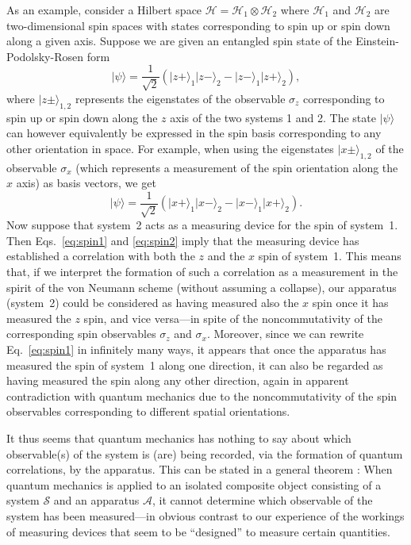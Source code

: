 \documentclass[twocolumn,rmp,aps,amsmath,amsfonts,noshowkeys,noshowpacs]{revtex4}
\newcommand{\ket}[1]{\ensuremath{|{#1\rangle}}}
\begin{document}
As an example, consider a Hilbert space
$\mathcal{H}=\mathcal{H}_1\otimes \mathcal{H}_2$ where $\mathcal{H}_1$
and $\mathcal{H}_2$ are two-dimensional spin spaces with states
corresponding to spin up or spin down along a given axis. Suppose we
are given an entangled spin state of the Einstein-Podolsky-Rosen form
\cite{Einstein:1935:dr}
%
\begin{equation} \label{eq:spin1} 
\ket{\psi} = \frac{1}{\sqrt{2}} (\ket{z+}_1
\ket{z-}_2 - \ket{z-}_1 \ket{z+}_2), 
\end{equation}
%
where $\ket{z\pm}_{1,2}$ represents the eigenstates of the observable
$\sigma_z$ corresponding to spin up or spin down along the $z$ axis of
the two systems 1 and 2. The state $\ket{\psi}$ can however
equivalently be expressed in the spin basis corresponding to any other
orientation in space. For example, when using the eigenstates
$\ket{x\pm}_{1,2}$ of the observable $\sigma_x$ (which represents a
measurement of the spin orientation along the $x$ axis) as basis
vectors, we get
%
\begin{equation} \label{eq:spin2} 
\ket{\psi} = \frac{1}{\sqrt{2}} (\ket{x+}_1
\ket{x-}_2 - \ket{x-}_1 \ket{x+}_2). 
\end{equation}
%
Now suppose that system~2 acts as a measuring device for the spin of
system~1.  Then Eqs.~\eqref{eq:spin1} and \eqref{eq:spin2} imply that
the measuring device has established a correlation with both the $z$
and the $x$ spin of system~1. This means that, if we interpret the
formation of such a correlation as a measurement in the spirit of the
von Neumann scheme (without assuming a collapse), our apparatus
(system~2) could be considered as having measured also the $x$ spin
once it has measured the $z$ spin, and vice versa---in spite of the
noncommutativity of the corresponding spin observables $\sigma_z$ and
$\sigma_x$. Moreover, since we can rewrite Eq.~\eqref{eq:spin1} in
infinitely many ways, it appears that once the apparatus has measured
the spin of system~1 along one direction, it can also be regarded as
having measured the spin along any other direction, again in apparent
contradiction with quantum mechanics due to the noncommutativity of
the spin observables corresponding to different spatial orientations.

It thus seems that quantum mechanics has nothing to say about which
observable(s) of the system is (are) being recorded, via the formation
of quantum correlations, by the apparatus. This can be stated in a
general theorem \citep{Zurek:1981:dd,Auletta:2000:rv}: When quantum
mechanics is applied to an isolated composite object consisting
of a system $\mathcal{S}$ and an apparatus $\mathcal{A}$, it cannot
determine which observable of the system has been measured---in
obvious contrast to our experience of the workings of measuring
devices that seem to be ``designed'' to measure certain quantities.
\end{document}
